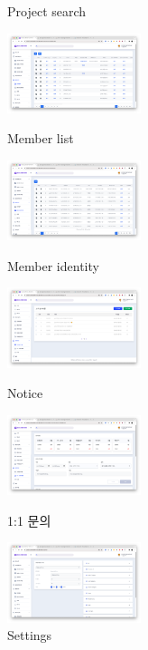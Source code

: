 \begin{itemize}
\begin{itemize}[label=$\star$]
\begin{figure}[!ht]
\begin{fullwidth}
{				      \caption*{Project search}
			      }\qquad
			      \parbox{0.35\textwidth}{
				      \centering
				      \includegraphics[width=0.35\textwidth]{images/builderhub-admin-member-list.png}
				      \caption*{Member list}
			      }
			      \parbox{0.35\textwidth}{
				      \centering
				      \includegraphics[width=0.35\textwidth]{images/builderhub-admin-member-identity.png}
				      \caption*{Member identity}
			      }\qquad
			      \parbox{0.35\textwidth}{
				      \centering
				      \includegraphics[width=0.35\textwidth]{images/builderhub-admin-notice.png}
				      \caption*{Notice}
			      }\qquad
			      \parbox{0.35\textwidth}{
				      \centering
				      \includegraphics[width=0.35\textwidth]{images/builderhub-admin-one-to-one-qa.png}
				      \caption*{1:1 문의}
			      }\qquad
			      \parbox{0.35\textwidth}{
				      \centering
				      \includegraphics[width=0.35\textwidth]{images/builderhub-admin-settings.png}
				      \caption*{Settings}
			      }
		      \end{fullwidth}

\end{figure}
\end{itemize}
\end{itemize}
